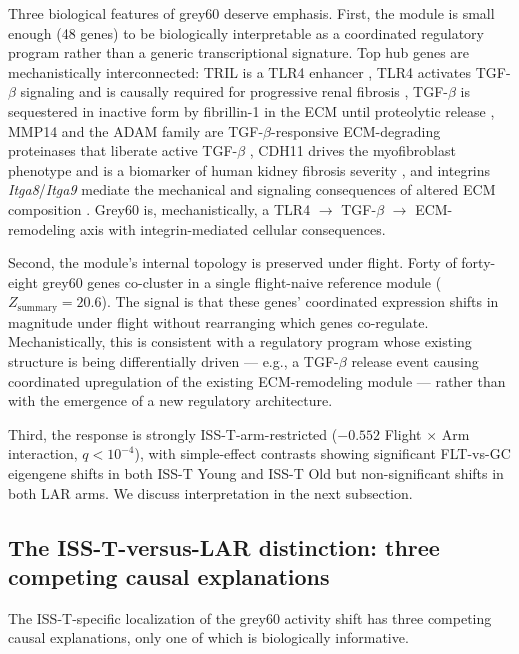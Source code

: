 \documentclass[11pt]{article}
\newcommand{\gene}[1]{\textit{#1}}
\begin{document}
Three biological features of grey60 deserve emphasis. First, the module is small enough (48 genes) to be biologically interpretable as a coordinated regulatory program rather than a generic transcriptional signature. Top hub genes are mechanistically interconnected: TRIL is a TLR4 enhancer \citep{carpenter2009tril}, TLR4 activates TGF-$\beta$ signaling and is causally required for progressive renal fibrosis \citep{souza2015tlr4, pulskens2010tlr4}, TGF-$\beta$ is sequestered in inactive form by fibrillin-1 in the ECM until proteolytic release \citep{ramirez2017fibrillin, charbonneau2020fibrillin}, MMP14 and the ADAM family are TGF-$\beta$-responsive ECM-degrading proteinases that liberate active TGF-$\beta$ \citep{ramachandran2013adam12, itoh2015mmp14}, CDH11 drives the myofibroblast phenotype and is a biomarker of human kidney fibrosis severity \citep{kawano2021cdh11, bischoff2022cdh11}, and integrins \gene{Itga8}/\gene{Itga9} mediate the mechanical and signaling consequences of altered ECM composition \citep{marek2016itga8, chen2023cul4b}. Grey60 is, mechanistically, a TLR4 $\rightarrow$ TGF-$\beta$ $\rightarrow$ ECM-remodeling axis with integrin-mediated cellular consequences.

Second, the module's internal topology is preserved under flight. Forty of forty-eight grey60 genes co-cluster in a single flight-naive reference module ($Z_{\text{summary}} = 20.6$). The signal is that these genes' coordinated expression shifts in magnitude under flight without rearranging which genes co-regulate. Mechanistically, this is consistent with a regulatory program whose existing structure is being differentially driven --- e.g., a TGF-$\beta$ release event causing coordinated upregulation of the existing ECM-remodeling module --- rather than with the emergence of a new regulatory architecture.

Third, the response is strongly ISS-T-arm-restricted ($-0.552$ Flight $\times$ Arm interaction, $q < 10^{-4}$), with simple-effect contrasts showing significant FLT-vs-GC eigengene shifts in both ISS-T Young and ISS-T Old but non-significant shifts in both LAR arms. We discuss interpretation in the next subsection.

\subsection{The ISS-T-versus-LAR distinction: three competing causal explanations}

The ISS-T-specific localization of the grey60 activity shift has three competing causal explanations, only one of which is biologically informative.
\end{document}
